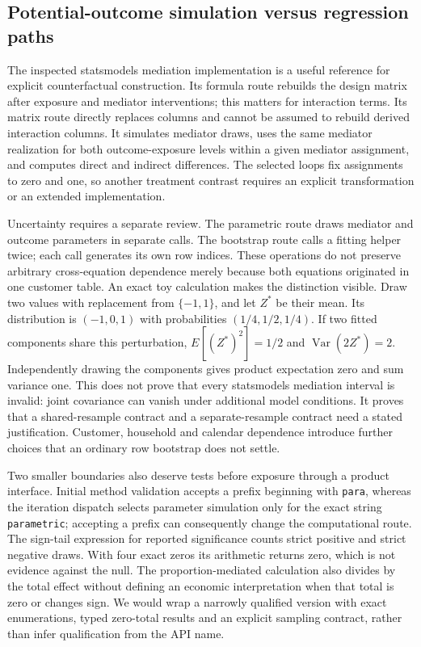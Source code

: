 \subsection{Potential-outcome simulation versus regression paths}
The inspected statsmodels mediation implementation is a useful reference for explicit counterfactual construction. Its formula route rebuilds the design matrix after exposure and mediator interventions; this matters for interaction terms. Its matrix route directly replaces columns and cannot be assumed to rebuild derived interaction columns. It simulates mediator draws, uses the same mediator realization for both outcome-exposure levels within a given mediator assignment, and computes direct and indirect differences. The selected loops fix assignments to zero and one, so another treatment contrast requires an explicit transformation or an extended implementation. \citep{exec25_pymed_statsmodels}

Uncertainty requires a separate review. The parametric route draws mediator and outcome parameters in separate calls. The bootstrap route calls a fitting helper twice; each call generates its own row indices. These operations do not preserve arbitrary cross-equation dependence merely because both equations originated in one customer table. An exact toy calculation makes the distinction visible. Draw two values with replacement from $\{-1,1\}$, and let $Z^*$ be their mean. Its distribution is $(-1,0,1)$ with probabilities $(1/4,1/2,1/4)$. If two fitted components share this perturbation, $E[(Z^*)^2]=1/2$ and $\operatorname{Var}(2Z^*)=2$. Independently drawing the components gives product expectation zero and sum variance one. This does not prove that every statsmodels mediation interval is invalid: joint covariance can vanish under additional model conditions. It proves that a shared-resample contract and a separate-resample contract need a stated justification. Customer, household and calendar dependence introduce further choices that an ordinary row bootstrap does not settle. \citep{exec25_pymed_statsmodels,exec25_pymed_choice}

Two smaller boundaries also deserve tests before exposure through a product interface. Initial method validation accepts a prefix beginning with \texttt{para}, whereas the iteration dispatch selects parameter simulation only for the exact string \texttt{parametric}; accepting a prefix can consequently change the computational route. The sign-tail expression for reported significance counts strict positive and strict negative draws. With four exact zeros its arithmetic returns zero, which is not evidence against the null. The proportion-mediated calculation also divides by the total effect without defining an economic interpretation when that total is zero or changes sign. We would wrap a narrowly qualified version with exact enumerations, typed zero-total results and an explicit sampling contract, rather than infer qualification from the API name. \citep{exec25_pymed_statsmodels,exec25_pymed_choice}

